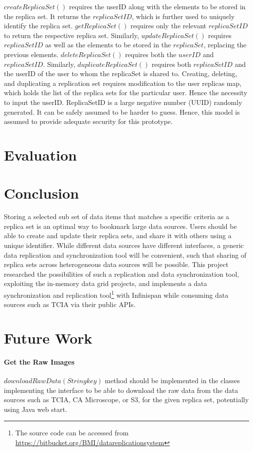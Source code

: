 \documentclass[conference]{IEEEtran}
\begin{document}
$createReplicaSet()$ requires the userID along with the elements to be stored in the replica set. It returns the $replicaSetID$, which is further used to uniquely identify the replica set. $getReplicaSet()$ requires only the relevant $replicaSetID$ to return the respective replica set. Similarly, $updateReplicaSet()$ requires $replicaSetID$ as well as the elements to be stored in the $replicaSet$, replacing the previous elements. $deleteReplicaSet()$ requires both the $userID$ and $replicaSetID$. Similarly, $duplicateReplicaSet()$ requires both $replicaSetID$ and the userID of the user to whom the replicaSet is shared to. Creating, deleting, and duplicating a replication set requires modification to the user replicas map, which holds the list of the replica sets for the particular user. Hence the necessity to input the userID. ReplicaSetID is a large negative number (UUID) randomly generated. It can be safely assumed to be harder to guess. Hence, this model is assumed to provide adequate security for this prototype.


\section{Evaluation}
\section{Conclusion}
Storing a selected sub set of data items that matches a specific criteria as a replica set is an optimal way to bookmark large data sources. Users should be able to create and update their replica sets, and share it with others using a unique identifier. While different data sources have different interfaces, a generic data replication and synchronization tool will be convenient, such that sharing of replica sets across heterogeneous data sources will be possible. This project researched the possibilities of such a replication and data synchronization tool, exploiting the in-memory data grid projects, and implements a data synchronization and replication tool\footnote{The source code can be accessed from \url{https://bitbucket.org/BMI/datareplicationsystem}} with Infinispan while consuming data sources such as TCIA via their public APIs.

\section{Future Work}
\paragraph*{Get the Raw Images}
$downloadRawData(String key)$ method should be implemented in the classes implementing the interface to be able to download the raw data from the data sources such as TCIA, CA Microscope, or S3, for the given replica set, potentially using Java web start.
\end{document}
